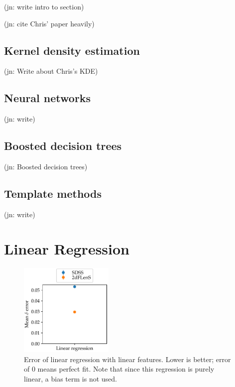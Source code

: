 \documentclass[11pt,twoside,openright]{report}
\newcommand\jn[1]{{\color{red}(jn: #1)}}
\begin{document}
\jn{write intro to section}

\jn{cite Chris' paper heavily}

\subsection{Kernel density estimation}

\jn{Write about Chris's KDE}

\subsection{Neural networks}

\jn{write}

\subsection{Boosted decision trees}

\jn{Boosted decision trees}

\subsection{Template methods}

\jn{write}

\section{Linear Regression}

  \begin{figure}
    \centering
    \includegraphics[width=0.4\textwidth]{linreg_plain.pdf}
    \caption{Error of linear regression with linear features. Lower is better; error of $0$ means perfect fit. Note that since this regression is purely linear, a bias term is not used.}
    \label{fig:linreg_plain}
  \end{figure}
\end{document}
